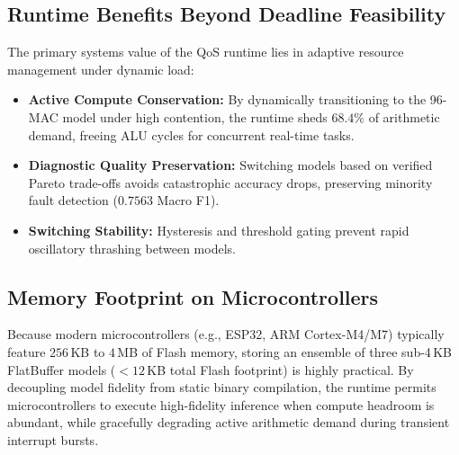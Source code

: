 \documentclass[journal]{IEEEtran}
\begin{document}
\subsection{Runtime Benefits Beyond Deadline Feasibility}
The primary systems value of the QoS runtime lies in adaptive resource management under dynamic load:
\begin{itemize}
    \item \textbf{Active Compute Conservation:} By dynamically transitioning to the 96-MAC model under high contention, the runtime sheds $68.4\%$ of arithmetic demand, freeing ALU cycles for concurrent real-time tasks.
    \item \textbf{Diagnostic Quality Preservation:} Switching models based on verified Pareto trade-offs avoids catastrophic accuracy drops, preserving minority fault detection ($0.7563$ Macro F1).
    \item \textbf{Switching Stability:} Hysteresis and threshold gating prevent rapid oscillatory thrashing between models.
\end{itemize}

\subsection{Memory Footprint on Microcontrollers}
Because modern microcontrollers (e.g., ESP32, ARM Cortex-M4/M7) typically feature $256$\,KB to $4$\,MB of Flash memory, storing an ensemble of three sub-4\,KB FlatBuffer models ($<12$\,KB total Flash footprint) is highly practical. By decoupling model fidelity from static binary compilation, the runtime permits microcontrollers to execute high-fidelity inference when compute headroom is abundant, while gracefully degrading active arithmetic demand during transient interrupt bursts.
\end{document}
